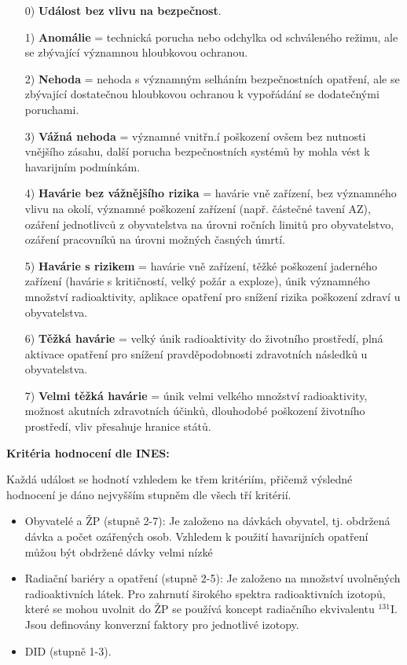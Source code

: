 \begin{itemize}
	\item[0)] \textbf{Událost bez vlivu na bezpečnost}.
	\item[1)] \textbf{Anomálie} = technická porucha nebo odchylka od schváleného režimu, ale se zbývající významnou hloubkovou ochranou.
	\item[2)] \textbf{Nehoda} = nehoda s významným selháním bezpečnostních opatření, ale se zbývající dostatečnou hloubkovou ochranou k vypořádání se dodatečnými poruchami.
	\item[3)] \textbf{Vážná nehoda} = významné vnitřn.í poškození ovšem bez nutnosti vnějšího zásahu, další porucha bezpečnostních systémů by mohla vést k havarijním podmínkám.
	\item[4)] \textbf{Havárie bez vážnějšího rizika} = havárie vně zařízení, bez významného vlivu na okolí, významné poškození zařízení (např. částečné tavení AZ), ozáření jednotlivců z obyvatelstva na úrovni ročních limitů pro obyvatelstvo, ozáření pracovníků na úrovni možných časných úmrtí.
	\item[5)] \textbf{Havárie s rizikem} = havárie vně zařízení, těžké poškození jaderného zařízení (havárie s kritičností, velký požár a exploze), únik významného množství radioaktivity, aplikace opatření pro snížení rizika poškození zdraví u obyvatelstva.
	\item[6)] \textbf{Těžká havárie} = velký únik radioaktivity do životního prostředí, plná aktivace opatření pro snížení pravděpodobnosti zdravotních následků u obyvatelstva.
	\item[7)] \textbf{Velmi těžká havárie} = únik velmi velkého množství radioaktivity, možnost akutních zdravotních účinků, dlouhodobé poškození životního prostředí, vliv přesahuje hranice států.
\end{itemize}

\textbf{Kritéria hodnocení dle INES:}

Každá událost se hodnotí vzhledem ke třem kritériím, přičemž výsledné hodnocení je dáno nejvyšším stupněm dle všech tří kritérií.

\begin{itemize}
    \item Obyvatelé a ŽP (stupně 2-7):
    Je založeno na dávkách obyvatel, tj. obdržená dávka a počet ozářených osob. Vzhledem k použití havarijních opatření můžou být obdržené dávky velmi nízké
    \item Radiační bariéry a opatření (stupně 2-5):
    Je založeno na množství uvolněných radioaktivních látek. Pro zahrnutí širokého spektra radioaktivních izotopů, které se mohou uvolnit do ŽP se používá koncept radiačního ekvivalentu $^{131}$I. Jsou definovány konverzní faktory pro jednotlivé izotopy.
    \item DID (stupně 1-3).
\end{itemize}

